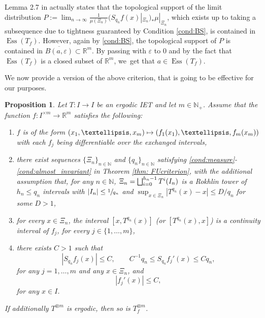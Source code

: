 \documentclass[10pt,a4paper]{amsart}
\newenvironment{enumeratei}
{\bgroup\def\theenumi{\roman{enumi}}\def\theenumii{\arabic{enumii}}\begin{enumerate}}
{\end{enumerate}\egroup}
\newcommand\mto{\mathchoice{\longmapsto}{\mapsto}{\mapsto}{\mapsto}}
\let\oldbigsqcup\bigsqcup
\renewcommand{\bigsqcup}{\mathop{\textstyle\oldbigsqcup}\displaylimits}
\let\epsilon\varepsilon
\DeclareMathOperator{\Ess}{Ess}
\theoremstyle{plain}
\newtheorem{proposition}[theorem]{Proposition}
\theoremstyle{definition}
\newcommand{\N}{\mathbb{N}}
\newcommand{\R}{\mathbb{R}}
\begin{document}
Lemma 2.7 in \cite{conze_cocycles_2011} actually states that
the
topological support of the limit distribution
$P:=\lim_{n\to\infty}\frac{1}{\mu(\Xi_n)}(S_{q_n}f(x)|_{\Xi_n})_*\mu|_{\Xi_n}$,
which exists up
to taking a subsequence due to tightness guaranteed by Condition
\eqref{cond:BS}, is contained in $\Ess(T_f)$. However, again by \eqref{cond:BS},
the topological support of $P$ is contained in $\overline{B(a,\epsilon)}\subset \R^m$. By
passing with $\epsilon$ to 0 and by the fact that $\Ess(T_f)$ is a closed subset
of $\R^m$, we~get that $a\in \Ess(T_f)$.

We now provide a version of the above criterion, that is going to be effective for our purposes.

\begin{proposition}\label{prop: effcriterion}
Let $T:I\to I$ be an ergodic IET and let $m\in \N_+$. Assume that the function $f:I^{\times m}\to \R^{m}$ satisfies the following:
\begin{enumeratei}
\item \label{cond:continuity} $f$ is of the form $(x_1,\ldots,x_m)\mto (f_1(x_1),\ldots,f_m(x_m))$ with each $f_j$ being differentiable over the exchanged intervals,
\item \label{cond:sequences} there exist sequences $\{\Xi_n\}_{n\in\N}$ and $\{q_n\}_{n\in\N}$ satisfying \eqref{cond:measure}-\eqref{cond:almost_invariant} in Theorem \ref{thm: FUcriterion}, with the additional assumption that, for any $n \in \N$, $\Xi_n=\bigsqcup_{i=0}^{h_n-1}T^{i}({I_n})$ is a Rokhlin tower of $h_n\le q_n$ intervals with $|I_n|\le\sfrac{1}{q_n}$ and $\sup_{x\in \Xi_n}|T^{q_n}(x)-x|\le D/q_n$ for some $D>1$,
\item \label{cond:cont_interval} for every $x\in\Xi_n$, the interval $[x,T^{q_n}(x)]$ (or $[T^{q_n}(x),x]$) is a continuity interval of $f_j$, for every $j\in\{1,\ldots,m\}$,
\item \label{cond:derivative} there exists $C>1$ such that
\[
|S_{q_n}f_j(x)|\le C, \qquad C^{-1}q_n\le S_{q_n}f_j'(x)\le Cq_n,
\]
for any $j=1,\ldots,m$ and any $x\in\Xi_n$, and
\[
|f_j'(x)|\le C,
\]
for any $x\in I$.
\end{enumeratei}
If additionally $T^{\otimes m}$ is ergodic, then so is $T_f^{\otimes m}$.
\end{proposition}
\end{document}
